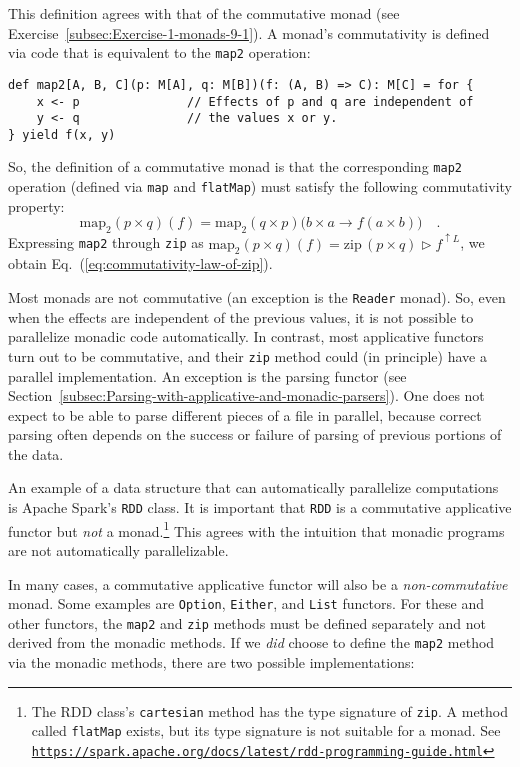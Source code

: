 This definition agrees with that of the commutative monad (see Exercise~\ref{subsec:Exercise-1-monads-9-1}).
A monad\textsf{'}s commutativity is defined via code that is equivalent to
the \lstinline!map2! operation:\texttt{\textcolor{blue}{\footnotesize{}}}
\begin{lstlisting}
def map2[A, B, C](p: M[A], q: M[B])(f: (A, B) => C): M[C] = for {
    x <- p               // Effects of p and q are independent of
    y <- q               // the values x or y.
} yield f(x, y)
\end{lstlisting}
 So, the definition of a commutative monad is that the corresponding
\lstinline!map2! operation (defined via \lstinline!map! and \lstinline!flatMap!)
must satisfy the following commutativity property: 
\[
\text{map}_{2}(p\times q)(f)=\text{map}_{2}(q\times p)\big(b\times a\rightarrow f(a\times b)\big)\quad.
\]
Expressing \lstinline!map2! through \lstinline!zip! as $\text{map}_{2}(p\times q)(f)=\text{zip}\,(p\times q)\triangleright f^{\uparrow L}$,
we obtain Eq.~(\ref{eq:commutativity-law-of-zip}).

Most monads are not commutative (an exception is the \lstinline!Reader!
monad). So, even when the effects are independent of the previous
values, it is not possible to parallelize monadic code automatically.
In contrast, most applicative functors turn out to be commutative,
and their \lstinline!zip! method could (in principle) have a parallel
implementation. An exception is the parsing functor (see Section~\ref{subsec:Parsing-with-applicative-and-monadic-parsers}).
One does not expect to be able to parse different pieces of a file
in parallel, because correct parsing often depends on the success
or failure of parsing of previous portions of the data.

An example of a data structure that can automatically parallelize
computations is Apache Spark\textsf{'}s \lstinline!RDD! class. It is important
that \lstinline!RDD! is a commutative applicative functor but \emph{not}
a monad.\footnote{The RDD class\textsf{'}s \lstinline!cartesian! method has the type signature
of \lstinline!zip!. A method called \lstinline!flatMap! exists,
but its type signature is not suitable for a monad. See \texttt{\href{https://spark.apache.org/docs/latest/rdd-programming-guide.html}{https://spark.apache.org/docs/latest/rdd-programming-guide.html}}} This agrees with the intuition that monadic programs are not automatically
parallelizable.

In many cases, a commutative applicative functor will also be a \emph{non-commutative}
monad. Some examples are \lstinline!Option!, \lstinline!Either!,
and \lstinline!List! functors. For these and other functors, the
\lstinline!map2! and \lstinline!zip! methods must be defined separately
and not derived from the monadic methods. If we \emph{did} choose
to define the \lstinline!map2! method via the monadic methods, there
are two possible implementations:

